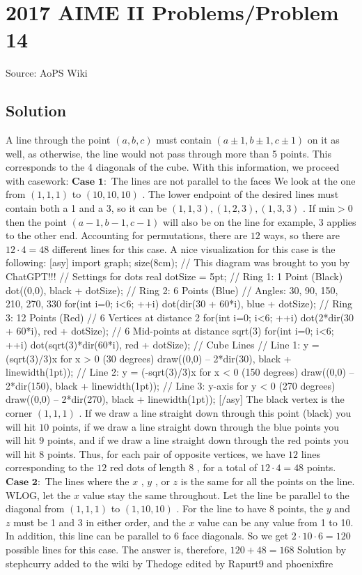 \documentclass[12pt]{article}
\begin{document}
\section*{{2017 AIME II Problems/Problem 14}}
Source: AoPS Wiki

\subsection*{Solution}
A line through the point $(a,b,c)$ must contain $(a \pm 1, b \pm 1, c \pm 1)$ on it as well, as otherwise, the line would not pass through more than 5 points. This corresponds to the 4 diagonals of the cube. With this information, we proceed with casework: $\textbf{Case 1}:$ The lines are not parallel to the faces We look at the one from $(1,1,1)$ to $(10,10,10)$ . The lower endpoint of the desired lines must contain both a 1 and a 3, so it can be $(1,1,3), (1,2,3), (1,3,3)$ . If $\textrm{min} > 0$ then the point $(a-1,b-1,c-1)$ will also be on the line for example, 3 applies to the other end. Accounting for permutations, there are $12$ ways, so there are $12 \cdot 4 = 48$ different lines for this case. A nice visualization for this case is the following: [asy] import graph; size(8cm); // This diagram was brought to you by ChatGPT!!! // Settings for dots real dotSize = 5pt; // Ring 1: 1 Point (Black) dot((0,0), black + dotSize); // Ring 2: 6 Points (Blue) // Angles: 30, 90, 150, 210, 270, 330 for(int i=0; i<6; ++i) { dot(dir(30 + 60*i), blue + dotSize); } // Ring 3: 12 Points (Red) // 6 Vertices at distance 2 for(int i=0; i<6; ++i) { dot(2*dir(30 + 60*i), red + dotSize); } // 6 Mid-points at distance sqrt(3) for(int i=0; i<6; ++i) { dot(sqrt(3)*dir(60*i), red + dotSize); } // Cube Lines // Line 1: y = (sqrt(3)/3)x for x > 0 (30 degrees) draw((0,0) -- 2*dir(30), black + linewidth(1pt)); // Line 2: y = (-sqrt(3)/3)x for x < 0 (150 degrees) draw((0,0) -- 2*dir(150), black + linewidth(1pt)); // Line 3: y-axis for y < 0 (270 degrees) draw((0,0) -- 2*dir(270), black + linewidth(1pt)); [/asy] The black vertex is the corner $(1,1,1)$ . If we draw a line straight down through this point (black) you will hit $10$ points, if we draw a line straight down through the blue points you will hit $9$ points, and if we draw a line straight down through the red points you will hit $8$ points. Thus, for each pair of opposite vertices, we have $12$ lines corresponding to the $12$ red dots of length $8$ , for a total of $12\cdot4=48$ points. $\textbf{Case 2}:$ The lines where the $x$ , $y$ , or $z$ is the same for all the points on the line. WLOG, let the $x$ value stay the same throughout. Let the line be parallel to the diagonal from $(1,1,1)$ to $(1,10,10)$ . For the line to have 8 points, the $y$ and $z$ must be 1 and 3 in either order, and the $x$ value can be any value from 1 to 10. In addition, this line can be parallel to 6 face diagonals. So we get $2 \cdot 10 \cdot 6 = 120$ possible lines for this case. The answer is, therefore, $120 + 48 = \boxed{168}$ Solution by stephcurry added to the wiki by Thedoge edited by Rapurt9 and phoenixfire
\end{document}
